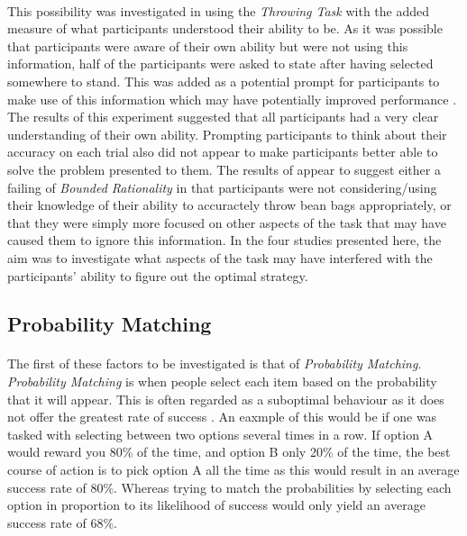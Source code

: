 \documentclass[12pt]{article}
\begin{document}
\paragraph{} This possibility was investigated in \cite{James2017} using the \textit{Throwing Task} with the added measure of what participants understood their ability to be. As it was possible that participants were aware of their own ability but were not using this information, half of the participants were asked to state after having selected somewhere to stand. This was added as a potential prompt for participants to make use of this information which may have potentially improved performance \citep{chang2014self}. The results of this experiment suggested that all participants had a very clear understanding of their own ability. Prompting participants to think about their accuracy on each trial also did not appear to make participants better able to solve the problem presented to them. The results of \cite{James2017} appear to suggest either a failing of \textit{Bounded Rationality} in that participants were not considering/using their knowledge of their ability to accuractely throw bean bags appropriately, or that they were simply more focused on other aspects of the task that may have caused them to ignore this information. In the four studies presented here, the aim was to investigate what aspects of the task may have interfered with the participants' ability to figure out the optimal strategy. 

\subsection*{Probability Matching}
\paragraph{} The first of these factors to be investigated is that of \textit{Probability Matching}. \textit{Probability Matching} is when people select each item based on the probability that it will appear. This is often regarded as a suboptimal behaviour as it does not offer the greatest rate of success \citep{Koehler2010}. An eaxmple of this would be if one was tasked with selecting between two options several times in a row. If option A would reward you 80\% of the time, and option B only 20\% of the time, the best course of action is to pick option A all the time as this would result in an average success rate of 80\%. Whereas trying to match the probabilities by selecting each option in proportion to its likelihood of success would only yield an average success rate of 68\%.
\end{document}
